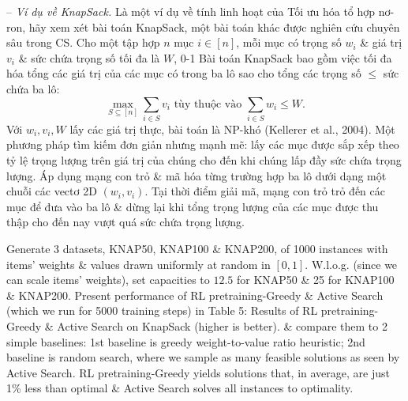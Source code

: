 \documentclass{article}
\begin{document}
\begin{itemize}
\begin{enumerate}
        -- {\it Ví dụ về KnapSack.} Là một ví dụ về tính linh hoạt của Tối ưu hóa tổ hợp nơ-ron, hãy xem xét bài toán KnapSack, một bài toán khác được nghiên cứu chuyên sâu trong CS. Cho một tập hợp $n$ mục $i\in[n]$, mỗi mục có trọng số $w_i$ \& giá trị $v_i$ \& sức chứa trọng số tối đa là $W$, 0-1 Bài toán KnapSack bao gồm việc tối đa hóa tổng các giá trị của các mục có trong ba lô sao cho tổng các trọng số $\le$ sức chứa ba lô:
        \begin{equation*}
        \max_{S\subseteq[n]} \sum_{i\in S} v_i\mbox{ tùy thuộc vào }\sum_{i\in S} w_i\le W.
        \end{equation*}
        Với $w_i,v_i,W$ lấy các giá trị thực, bài toán là NP-khó (Kellerer et al., 2004). Một phương pháp tìm kiếm đơn giản nhưng mạnh mẽ: lấy các mục được sắp xếp theo tỷ lệ trọng lượng trên giá trị của chúng cho đến khi chúng lấp đầy sức chứa trọng lượng. Áp dụng mạng con trỏ \& mã hóa từng trường hợp ba lô dưới dạng một chuỗi các vectơ 2D $(w_i,v_i)$. Tại thời điểm giải mã, mạng con trỏ trỏ đến các mục để đưa vào ba lô \& dừng lại khi tổng trọng lượng của các mục được thu thập cho đến nay vượt quá sức chứa trọng lượng.
        
        Generate 3 datasets, KNAP50, KNAP100 \& KNAP200, of 1000 instances with items' weights \& values drawn uniformly at random in $[0,1]$. W.l.o.g. (since we can scale items' weights), set capacities to $12.5$ for KNAP50 \& 25 for KNAP100 \& KNAP200. Present performance of RL pretraining-Greedy \& Active Search (which we run for 5000 training steps) in {\sf Table 5: Results of RL pretraining-Greedy \& Active Search on KnapSack (higher is better).} \& compare them to 2 simple baselines: 1st baseline is greedy weight-to-value ratio heuristic; 2nd baseline is random search, where we sample as many feasible solutions as seen by Active Search. RL pretraining-Greedy yields solutions that, in average, are just 1\% less than optimal \& Active Search solves all instances to optimality.
        

\end{enumerate}
\end{itemize}
\end{document}
